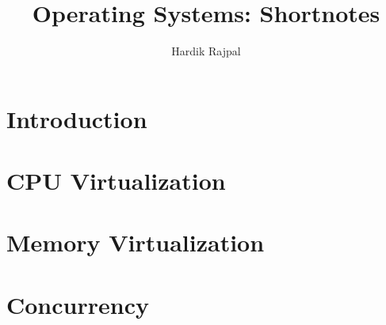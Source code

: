 \documentclass[10pt]{article}
\title{Operating Systems: Shortnotes}
\author{Hardik Rajpal}
\begin{document}
\maketitle
\tableofcontents
\pagebreak
\section{Introduction}

\section{CPU Virtualization}
\section{Memory Virtualization}
\section{Concurrency}
\end{document}
